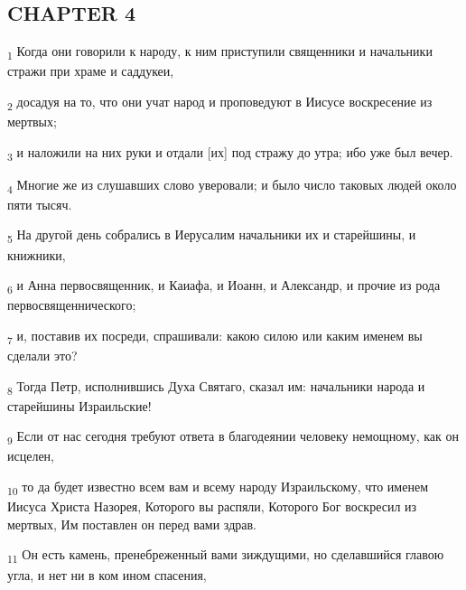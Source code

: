 \subsection{CHAPTER 4}
\begin{tcolorbox}
\textsubscript{1} Когда они говорили к народу, к ним приступили священники и начальники стражи при храме и саддукеи,
\end{tcolorbox}
\begin{tcolorbox}
\textsubscript{2} досадуя на то, что они учат народ и проповедуют в Иисусе воскресение из мертвых;
\end{tcolorbox}
\begin{tcolorbox}
\textsubscript{3} и наложили на них руки и отдали [их] под стражу до утра; ибо уже был вечер.
\end{tcolorbox}
\begin{tcolorbox}
\textsubscript{4} Многие же из слушавших слово уверовали; и было число таковых людей около пяти тысяч.
\end{tcolorbox}
\begin{tcolorbox}
\textsubscript{5} На другой день собрались в Иерусалим начальники их и старейшины, и книжники,
\end{tcolorbox}
\begin{tcolorbox}
\textsubscript{6} и Анна первосвященник, и Каиафа, и Иоанн, и Александр, и прочие из рода первосвященнического;
\end{tcolorbox}
\begin{tcolorbox}
\textsubscript{7} и, поставив их посреди, спрашивали: какою силою или каким именем вы сделали это?
\end{tcolorbox}
\begin{tcolorbox}
\textsubscript{8} Тогда Петр, исполнившись Духа Святаго, сказал им: начальники народа и старейшины Израильские!
\end{tcolorbox}
\begin{tcolorbox}
\textsubscript{9} Если от нас сегодня требуют ответа в благодеянии человеку немощному, как он исцелен,
\end{tcolorbox}
\begin{tcolorbox}
\textsubscript{10} то да будет известно всем вам и всему народу Израильскому, что именем Иисуса Христа Назорея, Которого вы распяли, Которого Бог воскресил из мертвых, Им поставлен он перед вами здрав.
\end{tcolorbox}
\begin{tcolorbox}
\textsubscript{11} Он есть камень, пренебреженный вами зиждущими, но сделавшийся главою угла, и нет ни в ком ином спасения,
\end{tcolorbox}
